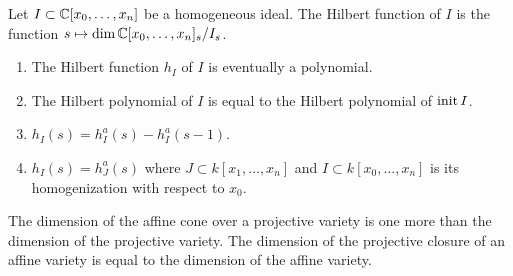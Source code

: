 \documentclass[12pt]{article}
\begin{document}
\begin{definition}
	Let $I \subset \mathbb{C}[x_0,\dots,x_n]$ be a homogeneous ideal. The Hilbert function of $I$ is the function
	$s\mapsto \dim \mathbb{C}[x_0,\dots,x_n]_s/I_s$.
\end{definition}

\begin{proposition}
	\begin{enumerate}
		\item The Hilbert function $h_I$ of $I$ is eventually a polynomial.
		\item The Hilbert polynomial of $I$ is equal to the Hilbert polynomial of $\operatorname{init} I$.
		\item $h_I(s) = h_I^a(s) - h_I^a(s-1)$.
		\item $h_I(s) = h_J^a(s)$ where $J\subset k[x_1,\dots,x_n]$ and $I \subset k[x_0,\dots,x_n]$ is its
		      homogenization with respect to $x_0$.
	\end{enumerate}
\end{proposition}

\begin{corollary}
	The dimension of the affine cone over a projective variety is one more than the dimension of the projective variety.
	The dimension of the projective closure of an affine variety is equal to the dimension of the affine variety.
\end{corollary}
\end{document}
